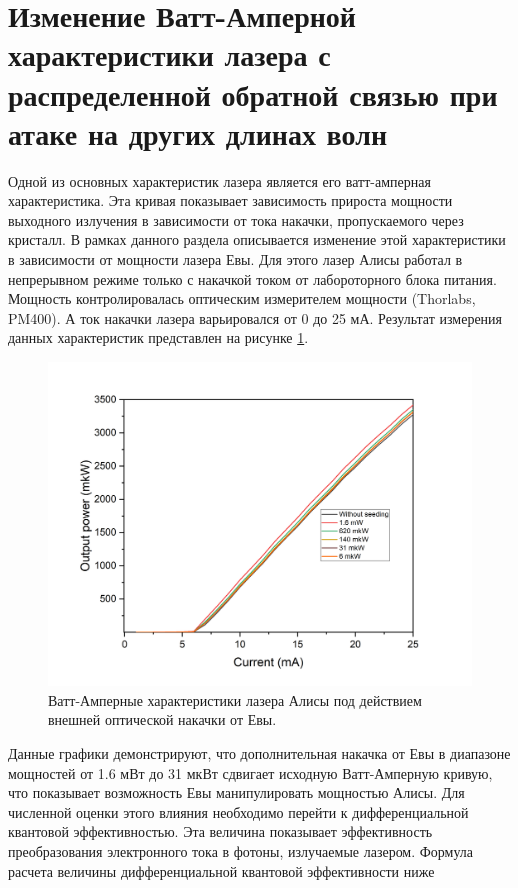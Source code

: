 \section{Изменение Ватт-Амперной характеристики лазера с распределенной обратной связью при атаке на других длинах волн}\label{sec:ch4/sect3}
Одной из основных характеристик лазера является его ватт-амперная характеристика. Эта кривая показывает зависимость прироста мощности выходного излучения в зависимости от тока накачки, пропускаемого через кристалл. В рамках данного раздела описывается изменение этой характеристики в зависимости от мощности лазера Евы.
Для этого лазер Алисы работал в непрерывном режиме только с накачкой током от лабороторного блока питания. Мощность контролировалась оптическим измерителем мощности (Thorlabs, PM400). А ток накачки лазера варьировался от 0 до 25 мА. 
Результат измерения данных характеристик представлен на рисунке \ref{fig:Watt-Amp ch4}. 
\begin{figure}
    \centering
    \includegraphics[width=\linewidth]{images/ватт ампер для диссера.png}
    \caption{Ватт-Амперные характеристики лазера Алисы под действием внешней оптической накачки от Евы.}
    \label{fig:Watt-Amp ch4}
\end{figure}
Данные графики демонстрируют, что дополнительная накачка от Евы в диапазоне мощностей от 1.6 мВт до 31 мкВт сдвигает исходную Ватт-Амперную кривую, что показывает возможность Евы манипулировать мощностью Алисы. Для численной оценки этого влияния необходимо перейти к дифференциальной квантовой эффективностью. Эта величина показывает эффективность преобразования электронного тока в фотоны, излучаемые лазером. Формула расчета величины дифференциальной квантовой эффективности ниже 
